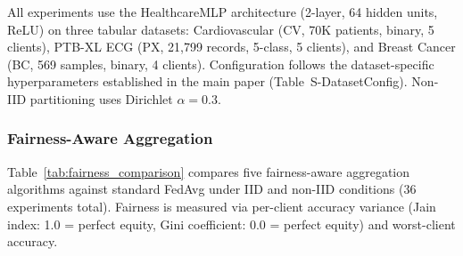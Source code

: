 \documentclass[conference]{IEEEtran}
\begin{document}
All experiments use the HealthcareMLP architecture (2-layer, 64 hidden units, ReLU) on three tabular datasets: Cardiovascular (CV, 70K patients, binary, 5 clients), PTB-XL ECG (PX, 21,799 records, 5-class, 5 clients), and Breast Cancer (BC, 569 samples, binary, 4 clients). Configuration follows the dataset-specific hyperparameters established in the main paper (Table~S-DatasetConfig). Non-IID partitioning uses Dirichlet $\alpha{=}0.3$.

\subsubsection{Fairness-Aware Aggregation}
\label{sec:fairness_exp}

Table~\ref{tab:fairness_comparison} compares five fairness-aware aggregation algorithms against standard FedAvg under IID and non-IID conditions (36 experiments total). Fairness is measured via per-client accuracy variance (Jain index: 1.0 = perfect equity, Gini coefficient: 0.0 = perfect equity) and worst-client accuracy.
\end{document}
